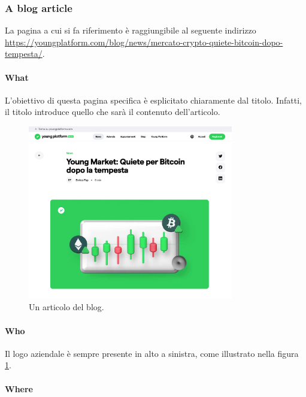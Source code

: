 \subsubsection{A blog article}

La pagina a cui si fa riferimento è raggiungibile al seguente indirizzo \\
\href{https://youngplatform.com/blog/news/mercato-crypto-quiete-bitcoin-dopo-tempesta/}{https://youngplatform.com/blog/news/mercato-crypto-quiete-bitcoin-dopo-tempesta/}.

\paragraph{What}

L'obiettivo di questa pagina specifica è esplicitato chiaramente dal 
titolo. Infatti, il titolo introduce quello che sarà il contenuto 
dell'articolo.

\begin{figure}[H]
  \centering
  \includegraphics[width=0.80\textwidth]{res/images/internal-pages/blog/blog-3.png}
  \caption{Un articolo del blog.}
  \label{fig:blog-3}
\end{figure}

\paragraph{Who}

Il logo aziendale è sempre presente in alto a sinistra, come illustrato 
nella figura \ref{fig:blog-3}.

\paragraph{Where}

